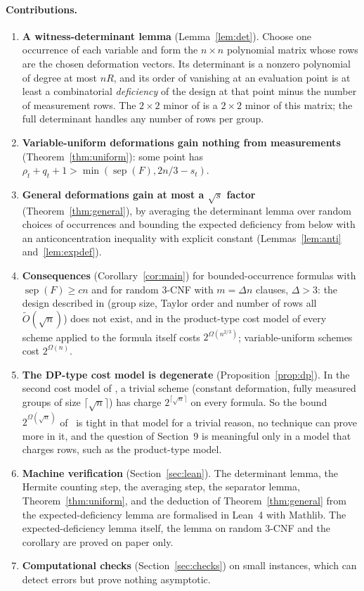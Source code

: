 \documentclass[11pt,a4paper]{article}
\theoremstyle{definition}
\theoremstyle{remark}
\newcommand{\sep}{\operatorname{sep}}
\begin{document}
\paragraph{Contributions.}
\begin{enumerate}
\item \textbf{A witness-determinant lemma} (Lemma~\ref{lem:det}). Choose one occurrence of
 each variable and form the $n\times n$ polynomial matrix whose rows are the chosen
 deformation vectors. Its determinant is a nonzero polynomial of degree at most $nR$, and its
 order of vanishing at an evaluation point is at least a combinatorial \emph{deficiency} of
 the design at that point minus the number of measurement rows. The $2\times2$ minor of
 \cite[Section~9]{DL} is a $2\times 2$ minor of this matrix; the full determinant handles any
 number of rows per group.
\item \textbf{Variable-uniform deformations gain nothing from measurements}
 (Theorem~\ref{thm:uniform}): some point has $\rho_t+q_t+1>\min(\sep(F),2n/3-s_t)$.
\item \textbf{General deformations gain at most a $\sqrt{s}$ factor}
 (Theorem~\ref{thm:general}), by averaging the determinant lemma over random choices of
 occurrences and bounding the expected deficiency from below with an anticoncentration
 inequality with explicit constant (Lemmas~\ref{lem:anti} and~\ref{lem:expdef}).
\item \textbf{Consequences} (Corollary~\ref{cor:main}) for bounded-occurrence formulas with
 $\sep(F)\ge cn$ and for random 3-CNF with $m=\Delta n$ clauses, $\Delta>3$: the design
 described in \cite[Section~9]{DL} (group size, Taylor order and number of rows all
 $\tilde O(\sqrt n)$) does not exist, and in the product-type cost model of
 \cite[Section~5.2]{DL} every scheme applied to the formula itself costs
 $2^{\Omega(n^{2/3})}$; variable-uniform schemes cost $2^{\Omega(n)}$.
\item \textbf{The DP-type cost model is degenerate} (Proposition~\ref{prop:dp}). In the second
 cost model of \cite[Section~5.2]{DL}, a trivial scheme (constant deformation, fully measured
 groups of size $\lceil\sqrt n\rceil$) has charge $2^{\lceil\sqrt n\rceil}$ on every formula.
 So the bound $2^{\Omega(\sqrt n)}$ of~\cite{DL} is tight in that model for a trivial reason,
 no technique can prove more in it, and the question of Section~9 is meaningful only in a
 model that charges rows, such as the product-type model.
\item \textbf{Machine verification} (Section~\ref{sec:lean}). The determinant lemma, the
 Hermite counting step, the averaging step, the separator lemma, Theorem~\ref{thm:uniform},
 and the deduction of Theorem~\ref{thm:general} from the expected-deficiency lemma are
 formalised in Lean~4 with Mathlib. The expected-deficiency lemma itself, the lemma on random
 3-CNF and the corollary are proved on paper only.
\item \textbf{Computational checks} (Section~\ref{sec:checks}) on small instances, which can
 detect errors but prove nothing asymptotic.
\end{enumerate}
\end{document}
